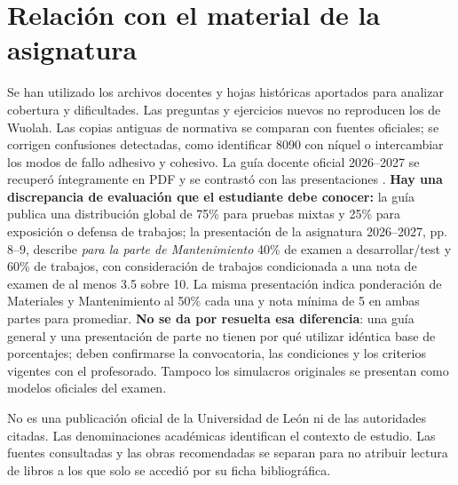 \section*{Relación con el material de la asignatura}
Se han utilizado los archivos docentes y hojas históricas aportados para analizar cobertura y dificultades. Las preguntas y ejercicios nuevos no reproducen los de Wuolah. Las copias antiguas de normativa se comparan con fuentes oficiales; se corrigen confusiones detectadas, como identificar 8090 con níquel o intercambiar los modos de fallo adhesivo y cohesivo. La guía docente oficial 2026--2027 se recuperó íntegramente en PDF y se contrastó con las presentaciones \cite{GUIA2026}. \textbf{Hay una discrepancia de evaluación que el estudiante debe conocer:} la guía publica una distribución global de 75\% para pruebas mixtas y 25\% para exposición o defensa de trabajos; la presentación de la asignatura 2026--2027, pp. 8--9, describe \emph{para la parte de Mantenimiento} 40\% de examen a desarrollar/test y 60\% de trabajos, con consideración de trabajos condicionada a una nota de examen de al menos 3.5 sobre 10. La misma presentación indica ponderación de Materiales y Mantenimiento al 50\% cada una y nota mínima de 5 en ambas partes para promediar. \textbf{No se da por resuelta esa diferencia}: una guía general y una presentación de parte no tienen por qué utilizar idéntica base de porcentajes; deben confirmarse la convocatoria, las condiciones y los criterios vigentes con el profesorado. Tampoco los simulacros originales se presentan como modelos oficiales del examen.

No es una publicación oficial de la Universidad de León ni de las autoridades citadas. Las denominaciones académicas identifican el contexto de estudio. Las fuentes consultadas y las obras recomendadas se separan para no atribuir lectura de libros a los que solo se accedió por su ficha bibliográfica.

